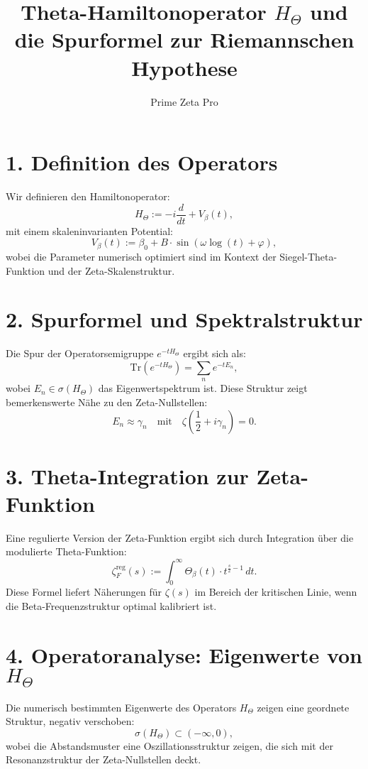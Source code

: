 \documentclass[12pt]{article}
\title{Theta-Hamiltonoperator $H_\Theta$ und die Spurformel zur Riemannschen Hypothese}
\author{Prime Zeta Pro}
\date{}
\begin{document}
\maketitle

\section*{1. Definition des Operators}

Wir definieren den Hamiltonoperator:
\[
H_\Theta := -i \frac{d}{dt} + V_\beta(t),
\]
mit einem skaleninvarianten Potential:
\[
V_\beta(t) := \beta_0 + B \cdot \sin\left( \omega \log(t) + \varphi \right),
\]
wobei die Parameter numerisch optimiert sind im Kontext der Siegel-Theta-Funktion und der Zeta-Skalenstruktur.

\section*{2. Spurformel und Spektralstruktur}

Die Spur der Operatorsemigruppe \( e^{-tH_\Theta} \) ergibt sich als:
\[
\text{Tr}\left(e^{-tH_\Theta}\right) = \sum_{n} e^{-t E_n},
\]
wobei \( E_n \in \sigma(H_\Theta) \) das Eigenwertspektrum ist. Diese Struktur zeigt bemerkenswerte Nähe zu den Zeta-Nullstellen:
\[
E_n \approx \gamma_n \quad \text{mit} \quad \zeta\left(\frac{1}{2} + i\gamma_n\right) = 0.
\]

\section*{3. Theta-Integration zur Zeta-Funktion}

Eine regulierte Version der Zeta-Funktion ergibt sich durch Integration über die modulierte Theta-Funktion:
\[
\zeta_F^{\text{reg}}(s) := \int_0^\infty \Theta_\beta(t) \cdot t^{\frac{s}{2} - 1} \, dt.
\]
Diese Formel liefert Näherungen für \( \zeta(s) \) im Bereich der kritischen Linie, wenn die Beta-Frequenzstruktur optimal kalibriert ist.

\section*{4. Operatoranalyse: Eigenwerte von $H_\Theta$}

Die numerisch bestimmten Eigenwerte des Operators \( H_\Theta \) zeigen eine geordnete Struktur, negativ verschoben:
\[
\sigma(H_\Theta) \subset (-\infty, 0),
\]
wobei die Abstandsmuster eine Oszillationsstruktur zeigen, die sich mit der Resonanzstruktur der Zeta-Nullstellen deckt.
\end{document}
